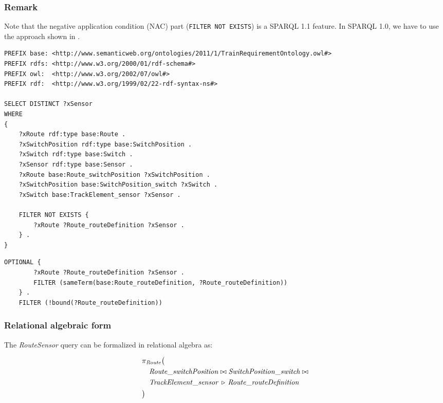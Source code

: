 \subsubsection{Remark} Note that the negative application condition (NAC) part (\texttt{FILTER NOT EXISTS}) is a SPARQL 1.1 feature. In SPARQL 1.0, we have to use the approach shown in .

\begin{lstlisting}[caption=The RouteSensor query in SPARQL, label=lst:routesensor-sparql]
PREFIX base: <http://www.semanticweb.org/ontologies/2011/1/TrainRequirementOntology.owl#>
PREFIX rdfs: <http://www.w3.org/2000/01/rdf-schema#>
PREFIX owl:  <http://www.w3.org/2002/07/owl#>
PREFIX rdf:  <http://www.w3.org/1999/02/22-rdf-syntax-ns#>

SELECT DISTINCT ?xSensor
WHERE
{
    ?xRoute rdf:type base:Route .
    ?xSwitchPosition rdf:type base:SwitchPosition .
    ?xSwitch rdf:type base:Switch .
    ?xSensor rdf:type base:Sensor .
    ?xRoute base:Route_switchPosition ?xSwitchPosition .
    ?xSwitchPosition base:SwitchPosition_switch ?xSwitch .
    ?xSwitch base:TrackElement_sensor ?xSensor .

    FILTER NOT EXISTS {
        ?xRoute ?Route_routeDefinition ?xSensor .
    } .
}
\end{lstlisting}

\begin{lstlisting}[caption=SPARQL 1.0 formula for the NAC part of the RouteSensor query, label=lst:routesensor-sparql-nac]
    OPTIONAL {
        ?xRoute ?Route_routeDefinition ?xSensor .
        FILTER (sameTerm(base:Route_routeDefinition, ?Route_routeDefinition))
    } .
    FILTER (!bound(?Route_routeDefinition))
\end{lstlisting}


\subsubsection{Relational algebraic form}  The \textit{RouteSensor} query can be formalized in relational algebra as:

\begin{align*}
& \pi_{\mathit{Route}} \big( \\
& \quad \mathit{Route\_switchPosition} \bowtie \mathit{SwitchPosition\_switch} \bowtie \\
& \quad \mathit{TrackElement\_sensor} \, \triangleright \, \mathit{Route\_routeDefinition} \\
& \big)
\end{align*}

